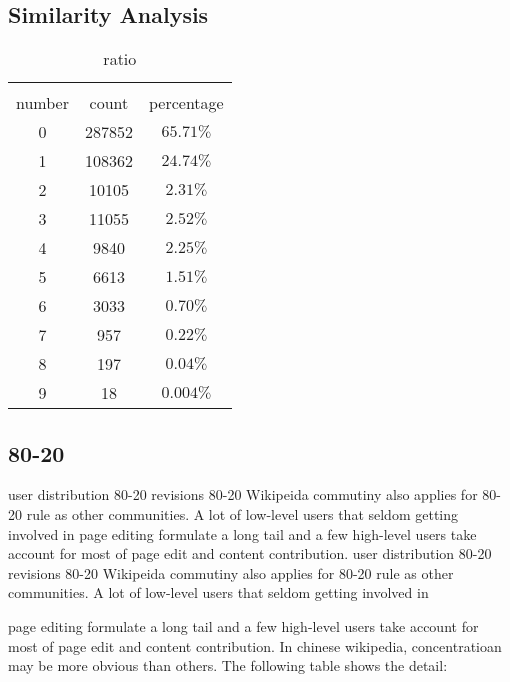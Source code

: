 \documentclass{elsarticle}
\begin{document}
\subsection{Similarity Analysis}
\label{sec:similarity-analysis}

\begin{table}
  \centering
  \caption{ratio}
  \begin{tabular}[center]{|c|c|c|}
    \hline\\
    number & count & percentage \\\hline
    0 & 287852& $65.71\%$\\\hline
    1 & 108362& $24.74\%$\\\hline
    2 & 10105& $2.31\%$\\\hline
    3 & 11055& $2.52\%$\\\hline
    4 & 9840&$2.25\%$ \\\hline
    5 & 6613& $1.51\%$\\\hline
    6 & 3033& $0.70\%$\\\hline
    7 & 957& $0.22\%$\\\hline
    8 & 197& $0.04\%$\\\hline
    9 & 18& $0.004\%$\\\hline
    
  \end{tabular}
  
\end{table}

\subsection{80-20}
\label{sec:80-20}
user distribution 80-20
revisions 80-20
Wikipeida commutiny also applies for 80-20 rule as other
communities. A lot of low-level users that seldom getting involved in
page editing formulate a long tail and a few high-level users take
account for most of page edit and content contribution.
\label{sec:80-20}
user distribution 80-20
revisions 80-20
Wikipeida commutiny also applies for 80-20 rule as other
communities. A lot of low-level users that seldom getting involved in

page editing formulate a long tail and a few high-level users take
account for most of page edit and content contribution. In chinese
wikipedia, concentratioan may be more obvious than others. The
following table shows the detail:
\end{document}
